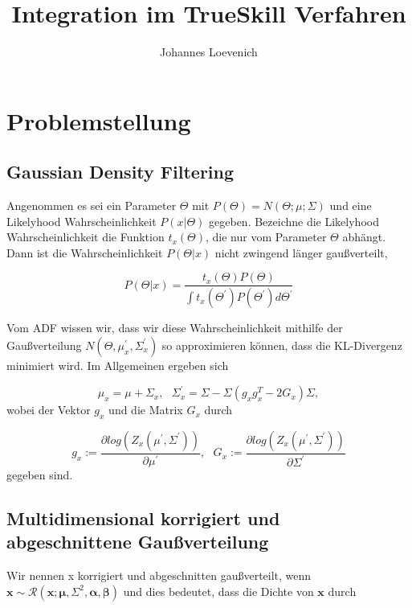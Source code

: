 \documentclass[12pt,a4paper]{scrartcl}
\title{Integration im TrueSkill Verfahren}
\author{Johannes Loevenich}
\numberwithin{equation}{section}
\begin{document}
\maketitle

\begin{abstract}

\end{abstract}

\section{Problemstellung}

\subsection{Gaussian Density Filtering}
Angenommen es sei ein Parameter $\varTheta$ mit $P(\varTheta) = N(\varTheta; \mu;\varSigma)$ und eine Likelyhood Wahrscheinlichkeit $P(x|\varTheta)$ gegeben. 
Bezeichne die Likelyhood Wahrscheinlichkeit die Funktion $t_x(\varTheta)$, die nur vom Parameter $\varTheta$ abhängt. 
Dann ist die Wahrscheinlichkeit $P(\varTheta|x)$ nicht zwingend länger gaußverteilt, 

\begin{equation}
  P(\varTheta|x) = \frac{t_x(\varTheta)P(\varTheta)}{\int t_x(\varTheta^{'})P(\varTheta^{'})d\varTheta^{'}}
\end{equation}

Vom ADF wissen wir, dass wir diese Wahrscheinlichkeit mithilfe der Gaußverteilung $N(\varTheta,\mu_x^{'},\varSigma_x^{'})$ so approximieren können, dass die KL-Divergenz minimiert wird. 
Im Allgemeinen ergeben sich 

\begin{equation}
 \mu_x = \mu + \varSigma_x, \text{			} \varSigma_x^{'} = \varSigma - \varSigma(g_xg_x^T - 2G_x)\varSigma,
\end{equation}
 wobei der Vektor \textbf{$g_x$} und die Matrix $G_x$ durch  

 \begin{equation}
  g_x := \frac{\partial log(Z_x(\mu^{'},\varSigma^{'}))}{\partial \mu^{'}}, \text{			} G_x := \frac{\partial log(Z_x(\mu^{'},\varSigma^{'}))}{\partial \varSigma^{'}}
 \end{equation}
gegeben sind. 

\subsection{Multidimensional korrigiert und abgeschnittene Gaußverteilung}
Wir nennen x korrigiert und abgeschnitten gaußverteilt, wenn $\mathbf{x} \sim \mathcal{R}(\mathbf{x};\mathbf{\mu},\mathbf{\varSigma}^2,\mathbf{\alpha},\mathbf{\beta})$ und dies bedeutet, dass die Dichte von $\mathbf{x}$ durch 
\end{document}
